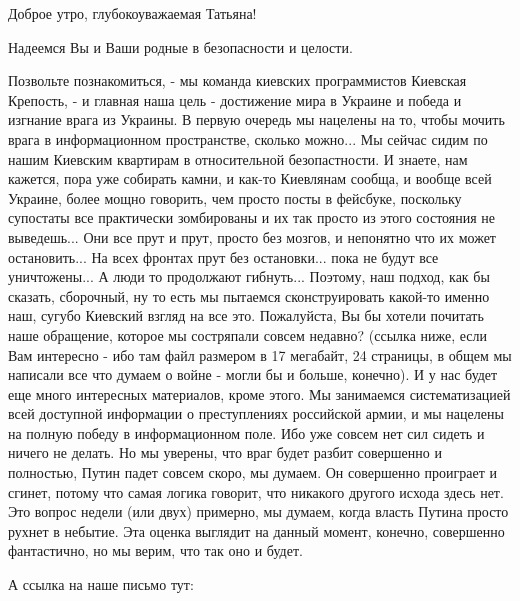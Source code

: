  
 
 
 
 

Доброе утро, глубокоуважаемая Татьяна!

Надеемся Вы и Ваши родные в безопасности и целости.

Позвольте познакомиться, - мы команда киевских программистов Киевская Крепость,
- и главная наша цель - достижение мира в Украине и победа и изгнание врага из
Украины. В первую очередь мы нацелены на то, чтобы мочить врага в
информационном пространстве, сколько можно... Мы сейчас сидим по нашим Киевским
квартирам в относительной безопастности.  И знаете, нам кажется, пора уже
собирать камни, и как-то Киевлянам сообща, и вообще всей Украине, более мощно
говорить, чем просто посты в фейсбуке, поскольку супостаты все практически
зомбированы и их так просто из этого состояния не выведешь... Они все прут и
прут, просто без мозгов, и непонятно что их может остановить... На всех фронтах
прут без остановки... пока не будут все уничтожены...  А люди то продолжают
гибнуть...  Поэтому, наш подход, как бы сказать, сборочный, ну то есть мы
пытаемся сконструировать какой-то именно наш, сугубо Киевский взгляд на все
это.  Пожалуйста, Вы бы хотели почитать наше обращение, которое мы состряпали
совсем недавно? (ссылка ниже, если Вам интересно - ибо там файл размером в 17
мегабайт, 24 страницы, в общем мы написали все что думаем о войне - могли бы и
больше, конечно). И у нас будет еще много интересных материалов, кроме этого.
Мы занимаемся систематизацией всей доступной информации о преступлениях
российской армии, и мы нацелены на полную победу в информационном поле. Ибо уже
совсем нет сил сидеть и ничего не делать. Но мы уверены, что враг будет разбит
совершенно и полностью, Путин падет совсем скоро, мы думаем.  Он совершенно
проиграет и сгинет, потому что самая логика говорит, что никакого другого
исхода здесь нет. Это вопрос недели (или двух) примерно, мы думаем, когда
власть Путина просто рухнет в небытие.  Эта оценка выглядит на данный момент,
конечно, совершенно фантастично, но мы верим, что так оно и будет.

А ссылка на наше письмо тут:

